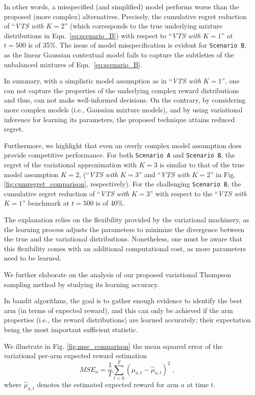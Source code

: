 \documentclass{article}
\newcommand{\ie}{i.e., }
\begin{document}
In other words, a misspecified (and simplified) model performs worse than the proposed (more complex) alternatives. Precisely, the cumulative regret reduction of ``\textit{VTS with }$K=2$'' (which corresponds to the true underlying mixture distributions in Eqn.~\eqref{eq:scenario_B}) with respect to ``\textit{VTS with }$K=1$'' at $t=500$ is of 35\%. The issue of model misspecification is evident for \texttt{Scenario B}, as the linear Gaussian contextual model fails to capture the subtleties of the unbalanced mixtures of Eqn.~\eqref{eq:scenario_B}.

In summary, with a simplistic model assumption as in ``\textit{VTS with }$K=1$'', one can not capture the properties of the underlying complex reward distributions and thus, can not make well-informed decisions. On the contrary, by considering more complex models (\ie Gaussian mixture models), and by using variational inference for learning its parameters, the proposed technique attains reduced regret.

Furthermore, we highlight that even an overly complex model assumption does provide competitive performance. For both \texttt{Scenario A} and \texttt{Scenario B}, the regret of the variational approximation with $K=3$ is similar to that of the true model assumption $K=2$, (``\textit{VTS with }$K=3$'' and ``\textit{VTS with }$K=2$'' in Fig. \ref{fig:cumregret_comparison}, respectively). For the challenging \texttt{Scenario B}, the cumulative regret reduction of ``\textit{VTS with }$K=3$'' with respect to the ``\textit{VTS with }$K=1$'' benchmark at $t=500$ is of 40\%. 

The explanation relies on the flexibility provided by the variational machinery, as the learning process adjusts the parameters to minimize the divergence between the true and the variational distributions. Nonetheless, one must be aware that this flexibility comes with an additional computational cost, as more parameters need to be learned.

We further elaborate on the analysis of our proposed variational Thompson sampling method by studying its learning accuracy.

In bandit algorithms, the goal is to gather enough evidence to identify the best arm (in terms of expected reward), and this can only be achieved if the arm properties (\ie the reward distributions) are learned accurately; their expectation being the most important sufficient statistic.

We illustrate in Fig. \ref{fig:mse_comparison} the mean squared error of the variational per-arm expected reward estimation
\begin{equation}
MSE_a=\frac{1}{T}\sum_{t=0}^T \left(\mu_{a,t}-\hat{\mu}_{a,t} \right)^2 \; ,
\end{equation}
where $\hat{\mu}_{a,t}$ denotes the estimated expected reward for arm $a$ at time $t$.
\end{document}
